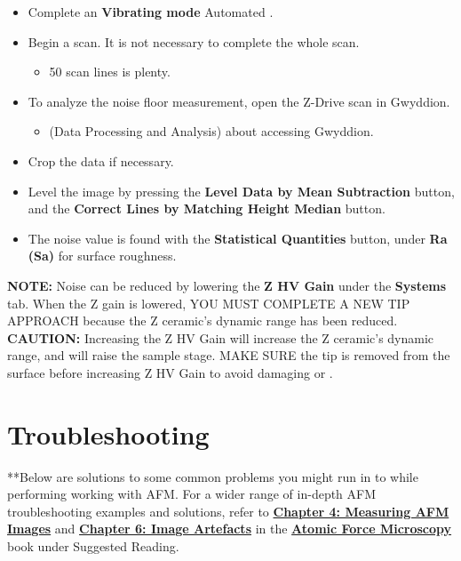 \documentclass{../lab}
\begin{document}
\begin{itemize}
        \item Complete an \textbf{Vibrating mode} Automated \textbf{}.

        \item Begin a scan.  It is not necessary to complete the whole scan.

        \begin{itemize}
            \item 50 scan lines is plenty.

        \end{itemize}

        \item To analyze the noise floor measurement, open the Z-Drive scan in Gwyddion.

        \begin{itemize}
            \item \textbf{} (Data Processing and Analysis) about accessing Gwyddion.

        \end{itemize}

        \item Crop the data if necessary.

        \item Level the image by pressing the \textbf{Level Data by Mean Subtraction} button, and the \textbf{Correct Lines by Matching Height Median} button.

        \item The noise value is found with the\textbf{ Statistical Quantities }button, under \textbf{Ra (Sa)} for surface roughness.

    \end{itemize}

\textbf{NOTE: }Noise can be reduced by lowering the \textbf{Z HV Gain} under the \textbf{Systems} tab.  When the Z gain is lowered, YOU MUST COMPLETE A NEW TIP APPROACH because the Z ceramic’s dynamic range has been reduced.
\textbf{CAUTION: }Increasing the Z HV Gain will increase the Z ceramic’s dynamic range, and will raise the sample stage.  MAKE SURE the tip is removed from the surface before increasing Z HV Gain to avoid damaging or \textbf{}.\section{Troubleshooting}

**Below are solutions to some common problems you might run in to while performing working with AFM.  For a wider range of in-depth AFM troubleshooting examples and solutions, refer to \href{http://experimentationlab.berkeley.edu/afm-book}{\textbf{\textbf{Chapter 4: Measuring AFM Images}}} and \href{http://experimentationlab.berkeley.edu/afm-book}{\textbf{\textbf{Chapter 6: Image Artefacts}}} in the \href{http://experimentationlab.berkeley.edu/afm-book}{\textbf{Atomic Force Microscopy}} book under Suggested Reading.
\end{document}
